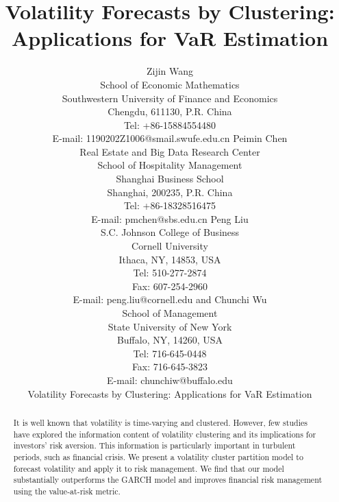 \documentclass[preprint,12pt,authoryear]{elsarticle}
\begin{document}

\begin{frontmatter}

\title{ Volatility Forecasts by Clustering: Applications for VaR Estimation } %

\vskip 1.5cm

\author{ {\large Zijin Wang}\\ School of Economic Mathematics \\
Southwestern University of Finance and Economics\\ Chengdu,
611130, P.R. China \\
 Tel: +86-15884554480\\ E-mail: 1190202Z1006@smail.swufe.edu.cn \vskip 0.5cm
{\large Peimin Chen{\small*}}\\Real Estate and Big Data Research Center\\
School of Hospitality Management\\Shanghai Business School \\
Shanghai, 200235, P.R. China \\
 Tel: +86-18328516475\\ E-mail: pmchen@sbs.edu.cn  \vskip 0.5cm
{\large Peng Liu }\\S.C. Johnson College of Business\\Cornell University\\
Ithaca, NY, 14853, USA\\
Tel: 510-277-2874\\ Fax: 607-254-2960\\  E-mail:
peng.liu@cornell.edu
 \vskip 0.5cm and  \vskip 0.5cm
{\large Chunchi Wu{\small*}} \\ School of Management\\
  State University of New York\\
  Buffalo, NY, 14260, USA\\
  Tel: 716-645-0448\\ Fax: 716-645-3823\\
  E-mail: chunchiw@buffalo.edu
\newpage
\begin{center}
{\Large Volatility Forecasts by Clustering: Applications for VaR Estimation }
\end{center}
  }
\begin{abstract}
It is well known that volatility is time-varying and clustered. However, few studies have explored the information content of volatility clustering and its implications for investors' risk aversion.  This information is particularly important in turbulent periods, such as financial crisis. We present a volatility cluster partition model to forecast volatility and apply it to risk management. We find that our model substantially outperforms the GARCH model and improves financial risk management using the value-at-risk metric.
\end{abstract}


\end{frontmatter}
\end{document}
